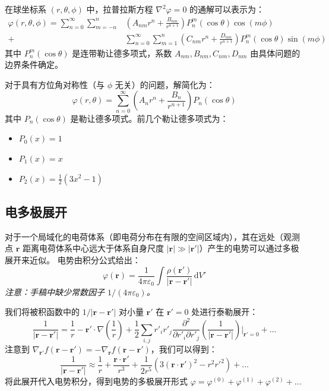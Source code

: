 \documentclass[fontset=none]{ctexart}
\begin{document}
\begin{example}[球坐标系下拉普拉斯方程的解]
在球坐标系 $(r, \theta, \phi)$ 中，拉普拉斯方程 $\nabla^2 \varphi = 0$ 的通解可以表示为：
\begin{equation}
\begin{aligned}
    \varphi(r, \theta, \phi) = \sum_{n=0}^{\infty} \sum_{m=-n}^{n} & \left( A_{nm} r^n + \frac{B_{nm}}{r^{n+1}} \right) P_n^m(\cos\theta) \cos(m\phi) \\
    + & \sum_{n=0}^{\infty} \sum_{m=1}^{n} \left( C_{nm} r^n + \frac{D_{nm}}{r^{n+1}} \right) P_n^m(\cos\theta) \sin(m\phi)
\end{aligned}
\end{equation}
其中 $P_n^m(\cos\theta)$ 是连带勒让德多项式，系数 $A_{nm}, B_{nm}, C_{nm}, D_{nm}$ 由具体问题的边界条件确定。

对于具有方位角对称性（与 $\phi$ 无关）的问题，解简化为：
\begin{equation}
    \varphi(r, \theta) = \sum_{n=0}^{\infty} \left( A_n r^n + \frac{B_n}{r^{n+1}} \right) P_n(\cos\theta)
\end{equation}
其中 $P_n(\cos\theta)$ 是勒让德多项式。前几个勒让德多项式为：
\begin{itemize}
    \item $P_0(x) = 1$
    \item $P_1(x) = x$
    \item $P_2(x) = \frac{1}{2}(3x^2-1)$
\end{itemize}
\end{example}

\subsection{电多极展开}
对于一个局域化的电荷体系（即电荷分布在有限的空间区域内），其在远处（观测点 $\bm{r}$ 距离电荷体系中心远大于体系自身尺度 $|\bm{r}| \gg |\bm{r'}|$）产生的电势可以通过多极展开来近似。
电势由积分公式给出：
\begin{equation}
    \varphi(\bm{r}) = \frac{1}{4\pi\varepsilon_0} \int \frac{\rho(\bm{r'})}{|\bm{r} - \bm{r'}|} \, \mathrm{d}V'
\end{equation}
\textit{注意：手稿中缺少常数因子 $1/(4\pi\varepsilon_0)$。}

我们将被积函数中的 $1/|\bm{r} - \bm{r'}|$ 对小量 $\bm{r'}$ 在 $\bm{r'}=0$ 处进行泰勒展开：
\begin{equation}
    \frac{1}{|\bm{r} - \bm{r'}|} = \frac{1}{r} - \bm{r'} \cdot \nabla\left(\frac{1}{r}\right) + \frac{1}{2} \sum_{i,j} r'_i r'_j \frac{\partial^2}{\partial r'_i \partial r'_j} \left(\frac{1}{|\bm{r} - \bm{r'}|}\right)\bigg|_{\bm{r'}=0} + \dots
\end{equation}
注意到 $\nabla_{\bm{r'}} f(\bm{r}-\bm{r'}) = -\nabla_{\bm{r}} f(\bm{r}-\bm{r'})$，我们可以得到：
\begin{equation}
    \frac{1}{|\bm{r} - \bm{r'}|} \approx \frac{1}{r} + \frac{\bm{r} \cdot \bm{r'}}{r^3} + \frac{1}{2r^5} \left( 3(\bm{r} \cdot \bm{r'})^2 - r^2 r'^2 \right) + \dots
\end{equation}
将此展开代入电势积分，得到电势的多极展开形式 $\varphi = \varphi^{(0)} + \varphi^{(1)} + \varphi^{(2)} + \dots$
\end{document}
